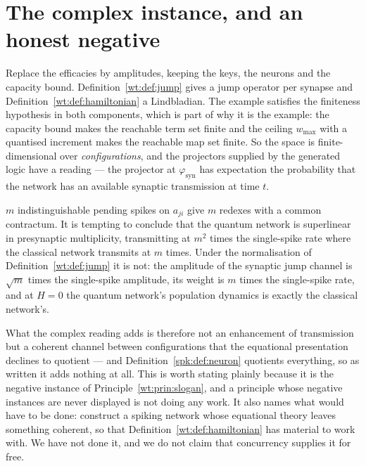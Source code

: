 \section{The complex instance, and an honest negative}

Replace the efficacies by amplitudes, keeping the keys, the neurons and the capacity
bound. Definition~\ref{wt:def:jump} gives a jump operator per synapse and
Definition~\ref{wt:def:hamiltonian} a Lindbladian. The example satisfies the finiteness
hypothesis in both components, which is part of why it is the example: the capacity bound
makes the reachable term set finite and the ceiling $w_{\max}$ with a quantised increment
makes the reachable map set finite. So the space is finite-dimensional over
\emph{configurations}, and the projectors supplied by the generated logic have a reading
--- the projector at $\varphi_{\mathrm{syn}}$ has expectation the probability that the
network has an available synaptic transmission at time $t$.

\begin{remark}
\label{spk:rmk:bosonic}
$m$ indistinguishable pending spikes on $a_{ji}$ give $m$ redexes with a common
contractum. It is tempting to conclude that the quantum network is superlinear in
presynaptic multiplicity, transmitting at $m^2$ times the single-spike rate where the
classical network transmits at $m$ times. Under the normalisation of
Definition~\ref{wt:def:jump} it is not: the amplitude of the synaptic jump channel is
$\sqrt{m}$ times the single-spike amplitude, its weight is $m$ times the single-spike
rate, and at $H = 0$ the quantum network's population dynamics is exactly the classical
network's.

What the complex reading adds is therefore not an enhancement of transmission but a
coherent channel between configurations that the equational presentation declines to
quotient --- and Definition~\ref{spk:def:neuron} quotients everything, so as written it
adds nothing at all. This is worth stating plainly because it is the negative instance of
Principle~\ref{wt:prin:slogan}, and a principle whose negative instances are never
displayed is not doing any work. It also names what would have to be done: construct a
spiking network whose equational theory leaves something coherent, so that
Definition~\ref{wt:def:hamiltonian} has material to work with. We have not done it, and we
do not claim that concurrency supplies it for free.
\end{remark}


